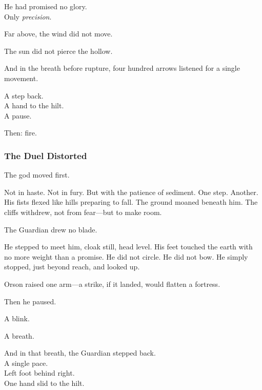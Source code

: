 \documentclass[12pt]{article}
\begin{document}
\vspace{0.5em}
He had promised no glory.\\
Only \textit{precision}.

\vspace{0.5em}
Far above, the wind did not move.

\vspace{0.5em}
The sun did not pierce the hollow.

\vspace{0.5em}
And in the breath before rupture, four hundred arrows listened for a single movement.

\vspace{0.5em}
A step back.\\
A hand to the hilt.\\
A pause.

\vspace{0.5em}
Then: fire.


\dotfill

\subsubsection{The Duel Distorted}

The god moved first.

\vspace{0.5em}
Not in haste. Not in fury. But with the patience of sediment. One step. Another. His fists flexed like hills preparing to fall. The ground moaned beneath him. The cliffs withdrew, not from fear---but to make room.

\vspace{0.5em}
The Guardian drew no blade.

\vspace{0.5em}
He stepped to meet him, cloak still, head level. His feet touched the earth with no more weight than a promise. He did not circle. He did not bow. He simply stopped, just beyond reach, and looked up.

\vspace{0.5em}
Orson raised one arm---a strike, if it landed, would flatten a fortress.

\vspace{0.5em}
Then he paused.

\vspace{0.5em}
A blink.

\vspace{0.5em}
A breath.

\vspace{0.5em}
And in that breath, the Guardian stepped back.\\
A single pace.\\
Left foot behind right.\\
One hand slid to the hilt.
\end{document}
